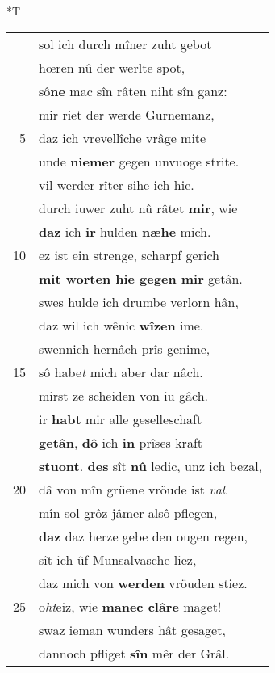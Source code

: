\documentclass[8pt,a4paper,notitlepage]{article}
\begin{document}
\begin{table}[ht]
\begin{minipage}[t]{0.5\linewidth}
\end{minipage}
\hspace{0.5cm}
\begin{minipage}[t]{0.5\linewidth}
\small
\begin{center}*T
\end{center}
\begin{tabular}{rl}
 & sol ich durch mîner zuht gebot\\ 
 & hœren nû der werlte spot,\\ 
 & sô\textbf{ne} mac sîn râten niht sîn ganz:\\ 
 & mir riet der werde Gurnemanz,\\ 
5 & daz ich vrevellîche vrâge mite\\ 
 & unde \textbf{niemer} gegen unvuoge strite.\\ 
 & vil werder rîter sihe ich hie.\\ 
 & durch iuwer zuht nû râtet \textbf{mir}, wie\\ 
 & \textbf{daz} ich \textbf{ir} hulden \textbf{næhe} mich.\\ 
10 & ez ist ein strenge, scharpf gerich\\ 
 & \textbf{mit worten hie gegen mir} getân.\\ 
 & swes hulde ich drumbe verlorn hân,\\ 
 & daz wil ich wênic \textbf{wîzen} ime.\\ 
 & swennich hernâch prîs genime,\\ 
15 & sô habe\textit{t} mich aber dar nâch.\\ 
 & mirst ze scheiden von iu gâch.\\ 
 & ir \textbf{habt} mir alle geselleschaft\\ 
 & \textbf{getân}, \textbf{dô} ich \textbf{in} prîses kraft\\ 
 & \textbf{stuont}. \textbf{des} sît \textbf{nû} ledic, unz ich bezal,\\ 
20 & dâ von mîn grüene vröude ist \textit{val}.\\ 
 & mîn sol grôz jâmer alsô pflegen,\\ 
 & \textbf{daz} daz herze gebe den ougen regen,\\ 
 & sît ich ûf Munsalvasche liez,\\ 
 & daz mich von \textbf{werden} vröuden stiez.\\ 
25 & o\textit{ht}eiz, wie \textbf{manec clâre} maget!\\ 
 & swaz ieman wunders hât gesaget,\\ 
 & dannoch pfliget \textbf{sîn} mêr der Grâl.\\ 

\end{tabular}
\end{minipage}
\end{table}
\end{document}
